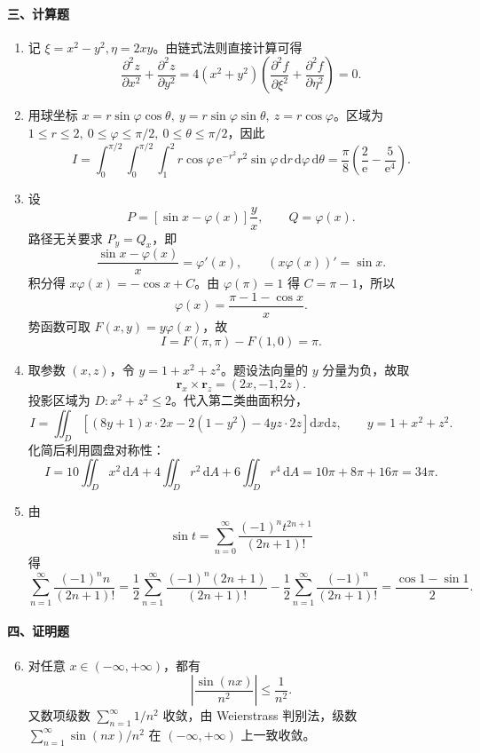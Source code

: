 \paragraph*{三、计算题}
\begin{enumerate}
  \item 记 \(\xi=x^2-y^2,\eta=2xy\)。由链式法则直接计算可得
  \[
    \frac{\partial^2 z}{\partial x^2}+\frac{\partial^2 z}{\partial y^2}
    =4(x^2+y^2)\left(\frac{\partial^2 f}{\partial \xi^2}+\frac{\partial^2 f}{\partial \eta^2}\right)=0.
  \]

  \item 用球坐标
  \(x=r\sin\varphi\cos\theta,\ y=r\sin\varphi\sin\theta,\ z=r\cos\varphi\)。区域为
  \(1\le r\le 2,\ 0\le\varphi\le\pi/2,\ 0\le\theta\le\pi/2\)，因此
  \[
    I=\int_0^{\pi/2}\!\!\int_0^{\pi/2}\!\!\int_1^2
    r\cos\varphi\,\mathrm{e}^{-r^2}r^2\sin\varphi\,\mathrm{d}r\,\mathrm{d}\varphi\,\mathrm{d}\theta
    =\frac{\pi}{8}\left(\frac2{\mathrm{e}}-\frac5{\mathrm{e}^4}\right).
  \]

  \item 设
  \[
    P=\left[\sin x-\varphi(x)\right]\frac{y}{x},\qquad Q=\varphi(x).
  \]
  路径无关要求 \(P_y=Q_x\)，即
  \[
    \frac{\sin x-\varphi(x)}{x}=\varphi'(x),
    \qquad (x\varphi(x))'=\sin x.
  \]
  积分得 \(x\varphi(x)=-\cos x+C\)。由 \(\varphi(\pi)=1\) 得 \(C=\pi-1\)，所以
  \[
    \varphi(x)=\frac{\pi-1-\cos x}{x}.
  \]
  势函数可取 \(F(x,y)=y\varphi(x)\)，故
  \[
    I=F(\pi,\pi)-F(1,0)=\pi.
  \]

  \item 取参数 \((x,z)\)，令 \(y=1+x^2+z^2\)。题设法向量的 \(y\) 分量为负，故取
  \[
    \mathbf r_x\times\mathbf r_z=(2x,-1,2z).
  \]
  投影区域为 \(D:x^2+z^2\le 2\)。代入第二类曲面积分，
  \[
    I=\iint_D\left[(8y+1)x\cdot2x-2(1-y^2)-4yz\cdot2z\right]\mathrm{d}x\mathrm{d}z,
    \qquad y=1+x^2+z^2.
  \]
  化简后利用圆盘对称性：
  \[
    I=10\iint_Dx^2\,\mathrm{d}A+4\iint_Dr^2\,\mathrm{d}A+6\iint_Dr^4\,\mathrm{d}A
    =10\pi+8\pi+16\pi=34\pi.
  \]

  \item 由
  \[
    \sin t=\sum_{n=0}^{\infty}\frac{(-1)^n t^{2n+1}}{(2n+1)!}
  \]
  得
  \[
    \sum_{n=1}^{\infty}\frac{(-1)^n n}{(2n+1)!}
    =\frac12\sum_{n=1}^{\infty}\frac{(-1)^n(2n+1)}{(2n+1)!}
     -\frac12\sum_{n=1}^{\infty}\frac{(-1)^n}{(2n+1)!}
    =\frac{\cos1-\sin1}{2}.
  \]
\end{enumerate}

\paragraph*{四、证明题}
\begin{enumerate}
  \setcounter{enumi}{5}
  \item 对任意 \(x\in(-\infty,+\infty)\)，都有
  \[
    \left|\frac{\sin(nx)}{n^2}\right|\le \frac1{n^2}.
  \]
  又数项级数 \(\sum_{n=1}^{\infty}1/n^2\) 收敛，由 Weierstrass 判别法，级数
  \(\sum_{n=1}^{\infty}\sin(nx)/n^2\) 在 \((-\infty,+\infty)\) 上一致收敛。
\end{enumerate}

